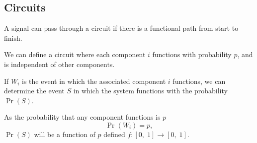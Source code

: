 \documentclass{article}
\begin{document}
\subsection{Circuits}
A signal can pass through a circuit if there is a functional path from start to finish.

We can define a circuit where each component \(i\) functions with probability \(p\),
and is independent of other components.

If \(W_i\) is the event in which the associated component \(i\) functions, we can
determine the event \(S\) in which the system functions with the probability
\(\Pr{\left( S \right)}\).

As the probability that any component functions is \(p\)
\begin{equation*}
    \Pr{\left( W_i \right)} = p,
\end{equation*}
\(\Pr{\left( S \right)}\) will be a function of \(p\) defined \(f:\left[ 0,\; 1 \right] \to \left[ 0,\; 1 \right]\).
\end{document}
